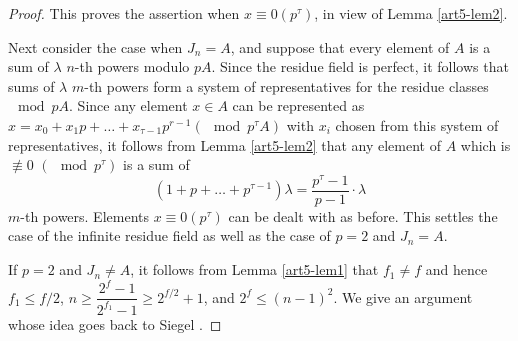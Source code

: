 \begin{proof}
This proves the assertion when $x\equiv0(p^{\tau})$, in view of Lemma \ref{art5-lem2}.


Next consider the case when $J_n = A$, and suppose that every element of $A$ is a sum of $\lambda$ $n$-th powers modulo $pA$. Since the residue field is perfect, it follows that sums of $\lambda $ $m$-th powers form a system of representatives for the residue classes $\mod p A$. Since any element $x \in A$ can be represented as $x = x_0 + x_1 p+ \ldots + x_{\tau-1} p^{r-1} (\mod p^\tau A)$ with $x_i$ chosen from this system of representatives, it follows from Lemma \ref{art5-lem2} that any element of $A$ which is $\nequiv 0$ $(\mod p^\tau)$ is a sum of 
$$
(1+ p + \ldots + p^{\tau -1}) \lambda = \dfrac{p^{\tau} -1}{p-1} \cdot \lambda 
$$
$m$-th powers. Elements $x \equiv 0 (p^\tau)$ can be dealt with as before. This settles the case of the infinite residue field as well as the case of $p=2$ and $J_n = A$.

If $p=2$ and $J_n \neq A$, it follows from Lemma \ref{art5-lem1} that $f_1 \neq f$ and hence $f_1 \leq f/2$, $n \geq \dfrac{2^f-1}{2^{f_1} -1} \geq 2^{f/2}+1$, and $2^f \leq (n-1)^2$. We give an argument whose idea goes back to Siegel \cite{art5-key3}.


\end{proof}
